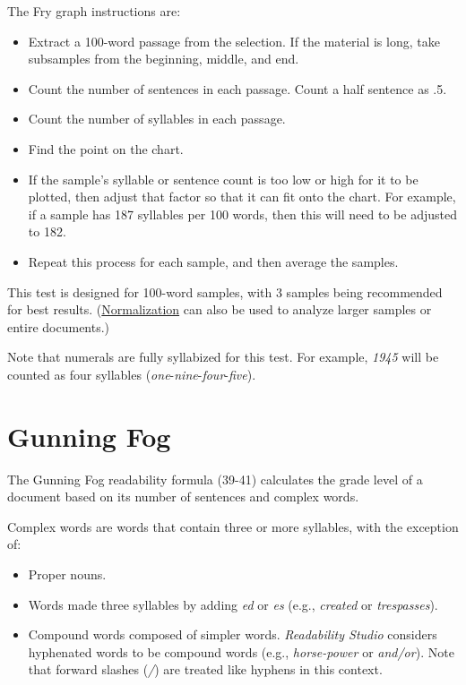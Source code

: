 \documentclass[
]{book}
\providecommand{\tightlist}{%
  \setlength{\itemsep}{0pt}\setlength{\parskip}{0pt}}
\theoremstyle{definition}
\theoremstyle{definition}
\theoremstyle{definition}
\theoremstyle{definition}
\theoremstyle{remark}
\begin{document}
\begin{minipage}{\textwidth}

The Fry graph instructions are:

\begin{itemize}
\tightlist
\item
  Extract a 100-word passage from the selection. If the material is long, take subsamples from the beginning, middle, and end.
\item
  Count the number of sentences in each passage. Count a half sentence as .5.
\item
  Count the number of syllables in each passage.
\item
  Find the point on the chart.
\item
  If the sample's syllable or sentence count is too low or high for it to be plotted, then adjust that factor so that it can fit onto the chart. For example, if a sample has 187 syllables per 100 words, then this will need to be adjusted to 182.
\item
  Repeat this process for each sample, and then average the samples.
\end{itemize}

\end{minipage}

This test is designed for 100-word samples, with 3 samples being recommended for best results. (\protect\hyperlink{glossary}{Normalization} can also be used to analyze larger samples or entire documents.)

Note that numerals are fully syllabized for this test. For example, \emph{1945} will be counted as four syllables (\emph{one}-\emph{nine}-\emph{four}-\emph{five}).

\newpage

\hypertarget{gunning-fog-test}{%
\section{\texorpdfstring{Gunning Fog}{Gunning Fog}}\label{gunning-fog-test}}

The Gunning Fog readability formula (39-41) calculates the grade level of a document based on its number of sentences and complex words.

Complex words are words that contain three or more syllables, with the exception of:

\begin{itemize}
\tightlist
\item
  Proper nouns.
\item
  Words made three syllables by adding \emph{ed} or \emph{es} (e.g., \emph{created} or \emph{trespasses}).
\item
  Compound words composed of simpler words. \emph{Readability Studio} considers hyphenated words to be compound words (e.g., \emph{horse-power} or \emph{and/or}). Note that forward slashes (\emph{/}) are treated like hyphens in this context.
\end{itemize}
\end{document}

